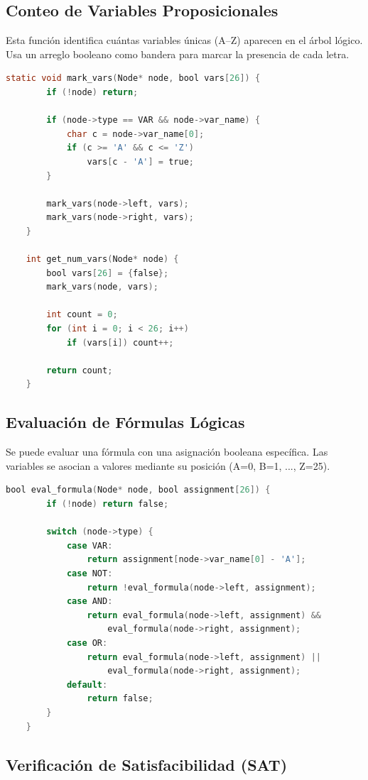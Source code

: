 \documentclass{report}
\begin{document}
	\subsection{Conteo de Variables Proposicionales}

	Esta función identifica cuántas variables únicas (A--Z) aparecen en el árbol lógico. Usa un arreglo booleano como bandera para marcar la presencia de cada letra.

	\begin{lstlisting}[language=C, caption={Conteo de variables proposicionales}]
	static void mark_vars(Node* node, bool vars[26]) {
		if (!node) return;

		if (node->type == VAR && node->var_name) {
			char c = node->var_name[0];
			if (c >= 'A' && c <= 'Z')
				vars[c - 'A'] = true;
		}

		mark_vars(node->left, vars);
		mark_vars(node->right, vars);
	}

	int get_num_vars(Node* node) {
		bool vars[26] = {false};
		mark_vars(node, vars);

		int count = 0;
		for (int i = 0; i < 26; i++)
			if (vars[i]) count++;

		return count;
	}
	\end{lstlisting}

	\subsection{Evaluación de Fórmulas Lógicas}

	Se puede evaluar una fórmula con una asignación booleana específica. Las variables se asocian a valores mediante su posición (A=0, B=1, ..., Z=25).

	\begin{lstlisting}[language=C, caption={Evaluación de una fórmula lógica}]
	bool eval_formula(Node* node, bool assignment[26]) {
		if (!node) return false;

		switch (node->type) {
			case VAR:
				return assignment[node->var_name[0] - 'A'];
			case NOT:
				return !eval_formula(node->left, assignment);
			case AND:
				return eval_formula(node->left, assignment) &&
					eval_formula(node->right, assignment);
			case OR:
				return eval_formula(node->left, assignment) ||
					eval_formula(node->right, assignment);
			default:
				return false;
		}
	}
	\end{lstlisting}

	\subsection{Verificación de Satisfacibilidad (SAT)}
\end{document}
